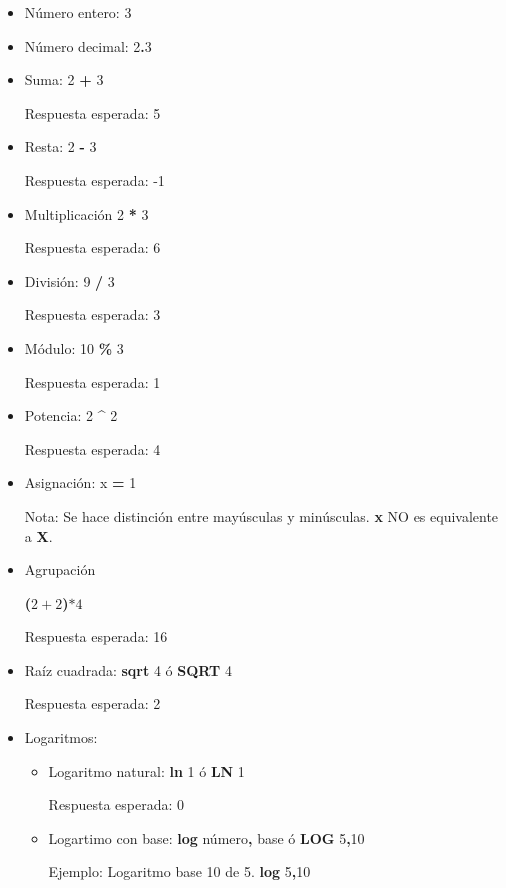 \documentclass[10pt]{report}
\begin{document}
\begin{itemize}
\item Número entero: 3 

\item Número decimal: 2\textbf{.}3

\item Suma: 2 \textbf{+} 3

Respuesta esperada: 5

\item Resta: 2 \textbf{-} 3

Respuesta esperada: -1

\item Multiplicación 2 \textbf{*} 3

Respuesta esperada: 6

\item División: 9 \textbf{/} 3

Respuesta esperada: 3

\item Módulo: 10 \textbf{\%} 3

Respuesta esperada: 1

\item Potencia: 2 \textbf{\^} 2

Respuesta esperada: 4

\item Asignación: x \textbf{=} 1

Nota: Se hace distinción entre mayúsculas y minúsculas. \textbf{x} NO es equivalente a \textbf{X}.

\item Agrupación

\textbf{(}$2+2$\textbf{)}$*4$

Respuesta esperada: 16

\item Raíz cuadrada: \textbf{sqrt} 4 ó \textbf{SQRT} 4

Respuesta esperada: 2

\item Logaritmos:

\begin{itemize}
\item Logaritmo natural: \textbf{ln} 1 ó \textbf{LN} 1

Respuesta esperada: 0

\item Logartimo con base: \textbf{log} número\textbf{,} base ó \textbf{LOG} 5\textbf{,}10

Ejemplo: Logaritmo base 10 de 5. \textbf{log} 5\textbf{,}10


\end{itemize}
\end{itemize}
\end{document}
